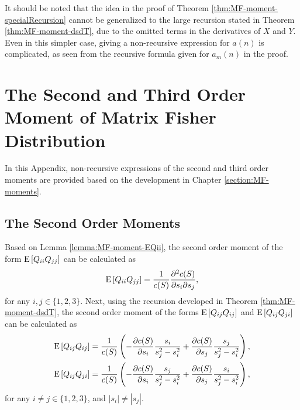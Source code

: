 It should be noted that the idea in the proof of Theorem \ref{thm:MF-moment-specialRecursion} cannot be generalized to the large recursion stated in Theorem \ref{thm:MF-moment-dsdT}, due to the omitted terms in the derivatives of $X$ and $Y$.
Even in this simpler case, giving a non-recursive expression for $a(n)$ is complicated, as seen from the recursive formula given for $a_m(n)$ in the proof.

\chapter{The Second and Third Order Moment of Matrix Fisher Distribution} \label{app:MF-moment-second-third}

In this Appendix, non-recursive expressions of the second and third order moments are provided based on the development in Chapter \ref{section:MF-moments}.

\section{The Second Order Moments}

Based on Lemma \ref{lemma:MF-moment-EQii}, the second order moment of the form $\mathrm{E}\left[ Q_{ii}Q_{jj} \right]$ can be calculated as
\begin{align} \label{eqn:MF-moment-EQiijj}
	\mathrm{E}\left[ Q_{ii}Q_{jj} \right] = \frac{1}{c(S)} \frac{\partial^2 c(S)}{\partial s_i \partial s_j},
\end{align}
for any $i,j\in\{1,2,3\}$.
Next, using the recursion developed in Theorem \ref{thm:MF-moment-dsdT}, the second order moment of the forms $\mathrm{E}\left[ Q_{ij}Q_{ij} \right]$ and $\mathrm{E}\left[ Q_{ij}Q_{ji} \right]$ can be calculated as
\begin{subequations} \label{eqn:MF-moment-EQijij-EQijji}
	\begin{align}
		\mathrm{E}\left[ Q_{ij}Q_{ij} \right] &= \frac{1}{c(S)}\left(-\frac{\partial c(S)}{\partial s_i}\frac{s_i}{s_j^2-s_i^2}+\frac{\partial c(S)}{\partial s_j}\frac{s_j}{s_j^2-s_i^2}\right), \\
		\mathrm{E}\left[ Q_{ij}Q_{ji} \right] &= \frac{1}{c(S)}\left(-\frac{\partial c(S)}{\partial s_i}\frac{s_j}{s_j^2-s_i^2}+\frac{\partial c(S)}{\partial s_j}\frac{s_i}{s_j^2-s_i^2}\right),
	\end{align}
\end{subequations}
for any $i\neq j \in \{1,2,3\}$, and $|s_i|\neq |s_j|$.


